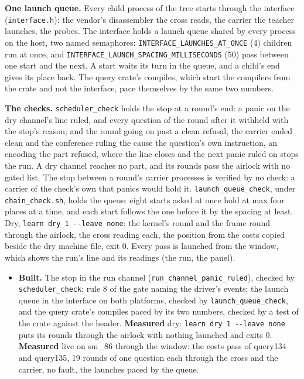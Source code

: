 \textbf{One launch queue.} Every child process of the tree starts through the interface (\texttt{interface.\allowbreak{}h}): the vendor's disassembler the cross reads, the carrier the teacher launches, the probes. The interface holds a launch queue shared by every process on the host, two named semaphores: \texttt{INTERFACE\_\allowbreak{}LAUNCHES\_\allowbreak{}AT\_\allowbreak{}ONCE} (4) children run at once, and \texttt{INTERFACE\_\allowbreak{}LAUNCH\_\allowbreak{}SPACING\_\allowbreak{}MILLISECONDS} (50) pass between one start and the next. A start waits its turn in the queue, and a child's end gives its place back. The query crate's compiles, which start the compilers from the crate and not the interface, pace themselves by the same two numbers.

\textbf{The checks.} \texttt{scheduler\_\allowbreak{}check} holds the stop at a round's end: a panic on the dry channel's line ruled, and every question of the round after it withheld with the stop's reason; and the round going on past a clean refusal, the carrier ended clean and the conference ruling the cause the question's own instruction, an encoding the part refused, where the line closes and the next panic ruled on stops the run. A dry channel reaches no part, and its rounds pass the airlock with no gated list. The stop between a round's carrier processes is verified by no check: a carrier of the check's own that panics would hold it. \texttt{launch\_\allowbreak{}queue\_\allowbreak{}check}, under \texttt{chain\_\allowbreak{}check.\allowbreak{}sh}, holds the queue: eight starts asked at once hold at max four places at a time, and each start follows the one before it by the spacing at least. Dry, \texttt{learn dry 1 -\allowbreak{}-\allowbreak{}leave none}: the kernel's round and the frame round through the airlock, the cross reading each, the position from the costs copied beside the dry machine file, exit 0. Every pass is launched from the window, which shows the run's line and its readings (the run, the panel).

\begin{itemize}
\item \textbf{Built.} The stop in the run channel (\texttt{run\_\allowbreak{}channel\_\allowbreak{}panic\_\allowbreak{}ruled}), checked by \texttt{scheduler\_\allowbreak{}check}; rule 8 of the gate naming the driver's events; the launch queue in the interface on both platforms, checked by \texttt{launch\_\allowbreak{}queue\_\allowbreak{}check}, and the query crate's compiles paced by its two numbers, checked by a test of the crate against the header. \textbf{Measured} dry: \texttt{learn dry 1 -\allowbreak{}-\allowbreak{}leave none} puts its rounds through the airlock with nothing launched and exits 0. \textbf{Measured} live on sm\_\allowbreak{}86 through the window: the costs pass of query134 and query135, 19 rounds of one question each through the cross and the carrier, no fault, the launches paced by the queue.
\end{itemize}
